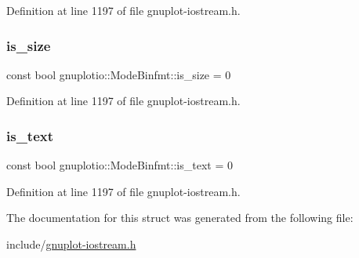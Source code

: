 Definition at line 1197 of file gnuplot-\/iostream.\+h.

\mbox{\label{structgnuplotio_1_1_mode_binfmt_a40a5a8ee815d6a5e9a3c30c8290a6967}} 
\subsubsection{\texorpdfstring{is\+\_\+size}{is\_size}}
{\footnotesize\ttfamily const bool gnuplotio\+::\+Mode\+Binfmt\+::is\+\_\+size = 0\hspace{0.3cm}{\ttfamily [static]}}



Definition at line 1197 of file gnuplot-\/iostream.\+h.

\mbox{\label{structgnuplotio_1_1_mode_binfmt_a7ab187fe922cac23b0d39ade81e5eb56}} 
\subsubsection{\texorpdfstring{is\+\_\+text}{is\_text}}
{\footnotesize\ttfamily const bool gnuplotio\+::\+Mode\+Binfmt\+::is\+\_\+text = 0\hspace{0.3cm}{\ttfamily [static]}}



Definition at line 1197 of file gnuplot-\/iostream.\+h.



The documentation for this struct was generated from the following file\+:\begin{DoxyCompactItemize}
\item 
include/\hyperlink{gnuplot-iostream_8h}{gnuplot-\/iostream.\+h}\end{DoxyCompactItemize}

